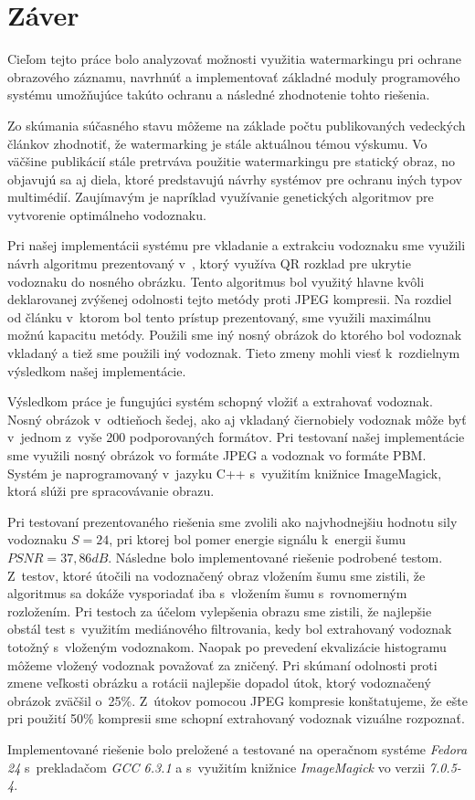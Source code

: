 \chapter{Záver}
Cieľom tejto práce bolo analyzovať možnosti využitia watermarkingu pri ochrane obrazového záznamu, navrhnúť a implementovať základné moduly programového systému umožňujúce takúto ochranu a následné zhodnotenie tohto riešenia.

Zo skúmania súčasného stavu môžeme na základe počtu publikovaných vedeckých článkov zhodnotiť, že watermarking je stále aktuálnou témou výskumu. Vo väčšine publikácií stále pretrváva použitie watermarkingu pre statický obraz, no objavujú sa aj diela, ktoré predstavujú návrhy systémov pre ochranu iných typov multimédií. Zaujímavým je napríklad využívanie genetických algoritmov pre vytvorenie optimálneho vodoznaku.

Pri našej implementácii systému pre vkladanie a extrakciu vodoznaku sme využili návrh algoritmu prezentovaný v~\cite{QRdecomposition}, ktorý využíva QR rozklad pre ukrytie vodoznaku do nosného obrázku. Tento algoritmus bol využitý hlavne kvôli deklarovanej zvýšenej odolnosti tejto metódy proti JPEG kompresii. Na rozdiel od článku v~ktorom bol tento prístup prezentovaný, sme využili maximálnu možnú kapacitu metódy. Použili sme iný nosný obrázok do ktorého bol vodoznak vkladaný a tiež sme použili iný vodoznak. Tieto zmeny mohli viesť k~rozdielnym výsledkom našej implementácie.

Výsledkom práce je fungujúci systém schopný vložiť a extrahovať vodoznak. Nosný obrázok v~odtieňoch šedej, ako aj vkladaný čiernobiely vodoznak môže byť v~jednom z~vyše 200 podporovaných formátov. Pri testovaní našej implementácie sme využili nosný obrázok vo formáte JPEG a vodoznak vo formáte PBM. Systém je naprogramovaný v~jazyku C++ s~využitím knižnice ImageMagick, ktorá slúži pre spracovávanie obrazu.

Pri testovaní prezentovaného riešenia sme zvolili ako najvhodnejšiu hodnotu sily vodoznaku $S=24$, pri ktorej bol pomer energie signálu k~energii šumu $PSNR=37,86dB$. Následne bolo implementované riešenie podrobené testom. Z~testov, ktoré útočili na vodoznačený obraz vložením šumu sme zistili, že algoritmus sa dokáže vysporiadať iba s~vložením šumu s~rovnomerným rozložením. Pri testoch za účelom vylepšenia obrazu sme zistili, že najlepšie obstál test s~využitím mediánového filtrovania, kedy bol extrahovaný vodoznak totožný s~vloženým vodoznakom. Naopak po prevedení ekvalizácie histogramu môžeme vložený vodoznak považovať za zničený. Pri skúmaní odolnosti proti zmene veľkosti obrázku a rotácii najlepšie dopadol útok, ktorý vodoznačený obrázok zväčšil o~25\%. Z~útokov pomocou JPEG kompresie konštatujeme, že ešte pri použití 50\% kompresii sme schopní extrahovaný vodoznak vizuálne rozpoznať.

Implementované riešenie bolo preložené a testované na operačnom systéme {\it Fedora 24} s~prekladačom {\it GCC 6.3.1} a s~využitím knižnice {\it ImageMagick} vo verzii {\it 7.0.5-4}.
